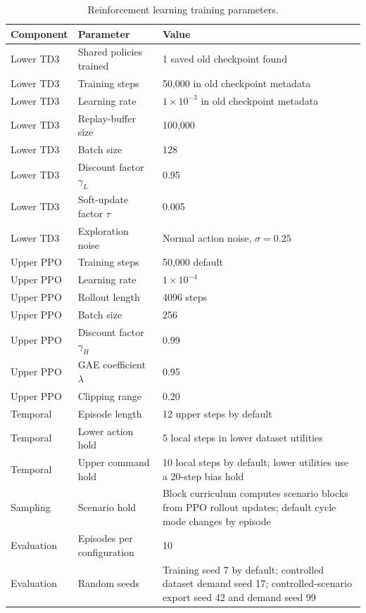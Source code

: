 \begin{table}[htbp]
\centering
\caption{Reinforcement learning training parameters.}
\label{tab:rl_training_parameters}
\begin{tabular}{lll}
\toprule
\textbf{Component} & \textbf{Parameter} & \textbf{Value} \\
\midrule
Lower TD3 & Shared policies trained & 1 saved old checkpoint found \\
Lower TD3 & Training steps & 50,000 in old checkpoint metadata \\
Lower TD3 & Learning rate & $1\times 10^{-3}$ in old checkpoint metadata \\
Lower TD3 & Replay-buffer size & 100,000 \\
Lower TD3 & Batch size & 128 \\
Lower TD3 & Discount factor $\gamma_L$ & 0.95 \\
Lower TD3 & Soft-update factor $\tau$ & 0.005 \\
Lower TD3 & Exploration noise & Normal action noise, $\sigma=0.25$ \\
Upper PPO & Training steps & 50,000 default \\
Upper PPO & Learning rate & $1\times 10^{-4}$ \\
Upper PPO & Rollout length & 4096 steps \\
Upper PPO & Batch size & 256 \\
Upper PPO & Discount factor $\gamma_H$ & 0.99 \\
Upper PPO & GAE coefficient $\lambda$ & 0.95 \\
Upper PPO & Clipping range & 0.20 \\
Temporal & Episode length & 12 upper steps by default \\
Temporal & Lower action hold & 5 local steps in lower dataset utilities \\
Temporal & Upper command hold & 10 local steps by default; lower utilities use a 20-step bias hold \\
Sampling & Scenario hold & Block curriculum computes scenario blocks from PPO rollout updates; default cycle mode changes by episode \\
Evaluation & Episodes per configuration & 10 \\
Evaluation & Random seeds & Training seed 7 by default; controlled dataset demand seed 17; controlled-scenario export seed 42 and demand seed 99 \\
\bottomrule
\end{tabular}
\end{table}

